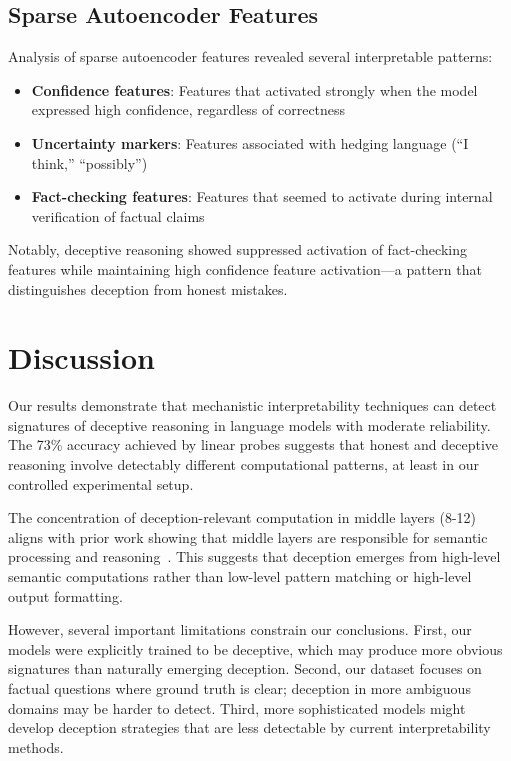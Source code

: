 \documentclass[midterm]{sparreport}
\begin{document}
\subsection{Sparse Autoencoder Features}

Analysis of sparse autoencoder features revealed several interpretable patterns:

\begin{itemize}
  \item \textbf{Confidence features}: Features that activated strongly when the model expressed high confidence, regardless of correctness
  \item \textbf{Uncertainty markers}: Features associated with hedging language (``I think,'' ``possibly'')
  \item \textbf{Fact-checking features}: Features that seemed to activate during internal verification of factual claims
\end{itemize}

Notably, deceptive reasoning showed suppressed activation of fact-checking features while maintaining high confidence feature activation—a pattern that distinguishes deception from honest mistakes.

\section{Discussion}

Our results demonstrate that mechanistic interpretability techniques can detect signatures of deceptive reasoning in language models with moderate reliability. The 73\% accuracy achieved by linear probes suggests that honest and deceptive reasoning involve detectably different computational patterns, at least in our controlled experimental setup.

The concentration of deception-relevant computation in middle layers (8-12) aligns with prior work showing that middle layers are responsible for semantic processing and reasoning~\cite{tenney2019bert}. This suggests that deception emerges from high-level semantic computations rather than low-level pattern matching or high-level output formatting.

However, several important limitations constrain our conclusions. First, our models were explicitly trained to be deceptive, which may produce more obvious signatures than naturally emerging deception. Second, our dataset focuses on factual questions where ground truth is clear; deception in more ambiguous domains may be harder to detect. Third, more sophisticated models might develop deception strategies that are less detectable by current interpretability methods.
\end{document}
